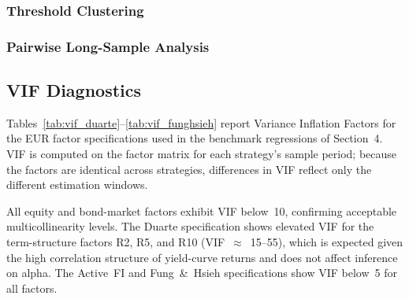  
\subsubsection{Threshold Clustering}
\label{app:clustering}
 

 
 
\subsubsection{Pairwise Long-Sample Analysis}
\label{app:pairwise}
 

\subsection{VIF Diagnostics}
\label{app:vif}
 
Tables~\ref{tab:vif_duarte}--\ref{tab:vif_funghsieh} report Variance
Inflation Factors for the EUR factor specifications used in the benchmark
regressions of Section~4. VIF is computed on the factor matrix for each
strategy's sample period; because the factors are identical across strategies,
differences in VIF reflect only the different estimation windows.
 
All equity and bond-market factors exhibit VIF below~10, confirming
acceptable multicollinearity levels. The Duarte specification shows
elevated VIF for the term-structure factors R2, R5, and R10
(VIF~$\approx$~15--55), which is expected given the high correlation
structure of yield-curve returns and does not affect inference on alpha.
The Active~FI and Fung~\&~Hsieh specifications show VIF below~5 for
all factors.
 

 

 
